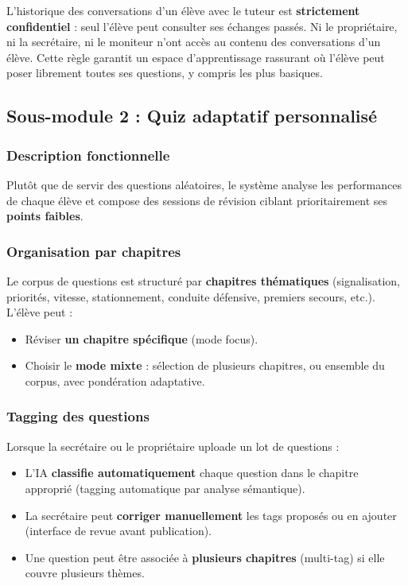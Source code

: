 \documentclass[12pt,a4paper]{article}
\newcommand{\highlight}[1]{\textbf{\color{primary}#1}}
\begin{document}
L'historique des conversations d'un élève avec le tuteur est \highlight{strictement confidentiel} : seul l'élève peut consulter ses échanges passés. Ni le propriétaire, ni la secrétaire, ni le moniteur n'ont accès au contenu des conversations d'un élève. Cette règle garantit un espace d'apprentissage rassurant où l'élève peut poser librement toutes ses questions, y compris les plus basiques.

\subsection{Sous-module 2 : Quiz adaptatif personnalisé}

\subsubsection{Description fonctionnelle}

Plutôt que de servir des questions aléatoires, le système analyse les performances de chaque élève et compose des sessions de révision ciblant prioritairement ses \textbf{points faibles}.

\subsubsection{Organisation par chapitres}

Le corpus de questions est structuré par \textbf{chapitres thématiques} (signalisation, priorités, vitesse, stationnement, conduite défensive, premiers secours, etc.). L'élève peut :

\begin{itemize}[leftmargin=*,itemsep=4pt]
    \item Réviser \textbf{un chapitre spécifique} (mode focus).
    \item Choisir le \textbf{mode mixte} : sélection de plusieurs chapitres, ou ensemble du corpus, avec pondération adaptative.
\end{itemize}

\subsubsection{Tagging des questions}

Lorsque la secrétaire ou le propriétaire uploade un lot de questions :

\begin{itemize}[leftmargin=*,itemsep=4pt]
    \item L'IA \textbf{classifie automatiquement} chaque question dans le chapitre approprié (tagging automatique par analyse sémantique).
    \item La secrétaire peut \textbf{corriger manuellement} les tags proposés ou en ajouter (interface de revue avant publication).
    \item Une question peut être associée à \textbf{plusieurs chapitres} (multi-tag) si elle couvre plusieurs thèmes.
\end{itemize}
\end{document}
